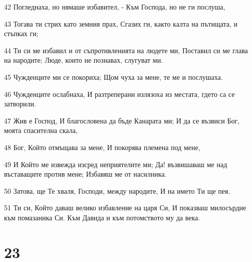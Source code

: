 \par 42 Погледнаха, но нямаше избавител, - Към Господа, но не ги послуша,
\par 43 Тогава ти стрих като земния прах, Сгазих ги, както калта на пътищата, и стъпках ги;
\par 44 Ти си ме избавил и от съпротивленията на людете ми, Поставил си ме глава на народите; Люде, които не познавах, слугуват ми.
\par 45 Чужденците ми се покориха; Щом чуха за мене, те ме и послушаха.
\par 46 Чужденците ослабнаха, И разтреперани излязоха из местата, гдето са се затворили.
\par 47 Жив е Господ, И благословена да бъде Канарата ми; И да се възвиси Бог, моята спасителна скала,
\par 48 Бог, Който отмъщава за мене, И покорява племена под мене,
\par 49 И Който ме извежда изсред неприятелите ми; Да! възвишаваш ме над въставащите против мене; Избавяш ме от насилника.
\par 50 Затова, ще Те хваля, Господи, между народите, И на името Ти ще пея.
\par 51 Ти си, Който даваш велико избавление на царя Си, И показваш милосърдие към помазаника Си. Към Давида и към потомството му да века.

\chapter{23}

